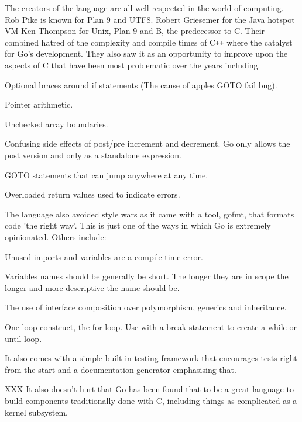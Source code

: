 The creators of the language are all well respected in the world of computing.
Rob Pike is known for Plan 9 and UTF8. 
Robert Griesemer for the Java hotspot VM
Ken Thompson for Unix, Plan 9 and B, the predecessor to C.
Their combined hatred of the complexity and compile times of C\verb!++! where the catalyst for Go's development.
They also saw it as an opportunity to improve upon the aspects of C that have been most problematic over the years including\cite{GO-DESIGN-EMAIL}.

\begin{itemize*}
	\item Optional braces around if statements (The cause of apples GOTO fail bug\cite{GOTOFAIL}).
	\item Pointer arithmetic.
    \item Unchecked array boundaries.
	\item Confusing side effects of post/pre increment and decrement. Go only allows the post version and only as a standalone expression.
	\item GOTO statements that can jump anywhere at any time.
    \item Overloaded return values used to indicate errors.
\end{itemize*}

The language also avoided style wars as it came with a tool, gofmt, that formats code 'the right way'.
This is just one of the ways in which Go is extremely opinionated.
Others include:
\begin{itemize*}
	\item Unused imports and variables are a compile time error.
    \item Variables names should be generally be short. The longer they are in scope the longer and more descriptive the name should be.
    \item The use of interface composition over polymorphism, generics and inheritance.
    \item One loop construct, the for loop. Use with a break statement to create a while or until loop.
\end{itemize*}

It also comes with a simple built in testing framework that encourages tests right from the start and a documentation generator emphasising that.

XXX
It also doesn't hurt that Go has been found that to be a great language to build components traditionally done with C, including things as complicated as a kernel subsystem\cite{GONET}.

